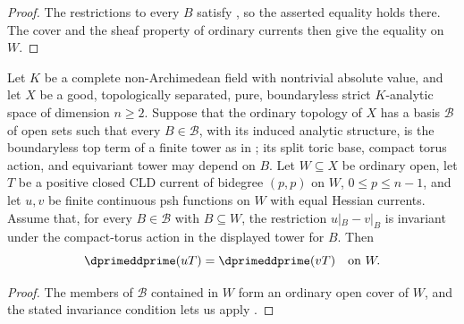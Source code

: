 \begin{proof}
The restrictions to every \(B\) satisfy
, so the asserted
equality holds there.  The cover and the sheaf property of ordinary currents
then give the equality on \(W\).
\end{proof}

\begin{corollary}
\label{cor:p213-invariant-toric-open-polydisc-tower-basis-bt}
Let \(K\) be a complete non-Archimedean field with nontrivial absolute
value, and let \(X\) be a good, topologically separated, pure,
boundaryless strict \(K\)-analytic space of dimension \(n\geq2\).  Suppose
that the ordinary topology of \(X\) has a basis \(\mathscr B\) of open sets
such that every \(B\in\mathscr B\), with its induced analytic structure,
is the boundaryless top term of a finite tower as in
; its split
toric base, compact torus action, and equivariant tower may depend on \(B\).
Let
\(W\subseteq X\) be ordinary open, let \(T\) be a positive closed CLD current
of bidegree \((p,p)\) on \(W\), \(0\leq p\leq n-1\), and let \(u,v\) be
finite continuous psh functions on \(W\) with equal Hessian currents.
Assume that, for every \(B\in\mathscr B\) with \(B\subseteq W\), the
restriction \(u|_B-v|_B\) is invariant under the compact-torus action in the
displayed tower for \(B\).  Then
\[
                 \dprimeddprime(uT)=\dprimeddprime(vT)
                 \quad\text{on }W.
\]
\end{corollary}

\begin{proof}
The members of \(\mathscr B\) contained in \(W\) form an ordinary open
cover of \(W\), and the stated invariance condition lets us apply
.
\end{proof}

